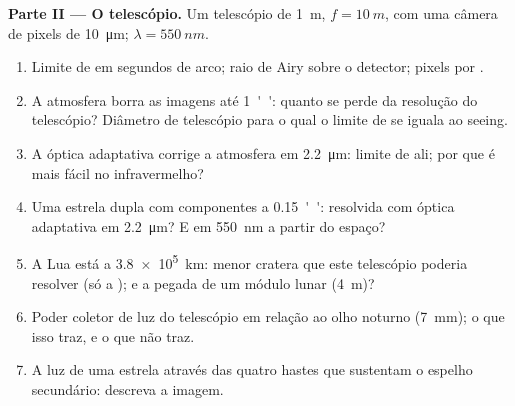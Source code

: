 \begin{problem}
\medskip
\noindent\textbf{Parte II --- O telescópio.}
Um telescópio de \qty{1}{m}, $f = \qty{10}{m}$, com uma câmera de pixels de \qty{10}{\micro m};
$\lambda = \qty{550}{nm}$.
\begin{enumerate}[resume]
  \item Limite de  em segundos de arco; raio de Airy sobre o
        detector; pixels por .
  \item A atmosfera borra as imagens até \qty{1}{''}: quanto se perde da
        resolução do telescópio? Diâmetro de telescópio para o qual
        o limite de  se iguala ao seeing.
  \item A óptica adaptativa corrige a atmosfera em \qty{2.2}{\micro m}:
        limite de  ali; por que é mais fácil no infravermelho?
  \item Uma estrela dupla com componentes a \qty{0.15}{''}: resolvida com
        óptica adaptativa em \qty{2.2}{\micro m}? E em \qty{550}{nm} a partir do espaço?
  \item A Lua está a \qty{3.8e5}{km}: menor cratera que este telescópio
        poderia resolver (só a ); e a pegada de um módulo
        lunar (\qty{4}{m})?
  \item Poder coletor de luz do telescópio em relação ao
        olho noturno (\qty{7}{mm}); o que isso traz, e o que não traz.
  \item A luz de uma estrela através das quatro hastes que sustentam o
        espelho secundário: descreva a imagem.
\end{enumerate}


\end{problem}
